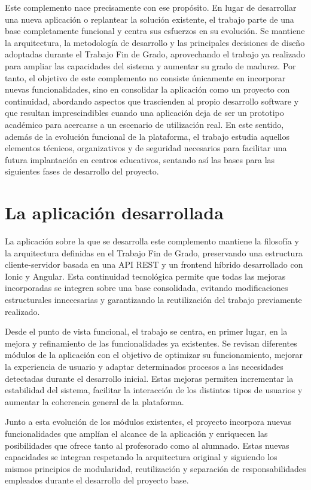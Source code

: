 Este complemento nace precisamente con ese propósito. En lugar de desarrollar una nueva aplicación o replantear la solución existente, el trabajo parte de una base completamente funcional y centra sus esfuerzos en su evolución. Se mantiene la arquitectura, la metodología de desarrollo y las principales decisiones de diseño adoptadas durante el Trabajo Fin de Grado, aprovechando el trabajo ya realizado para ampliar las capacidades del sistema y aumentar su grado de madurez.
Por tanto, el objetivo de este complemento no consiste únicamente en incorporar nuevas funcionalidades, sino en consolidar la aplicación como un proyecto con continuidad, abordando aspectos que trascienden al propio desarrollo software y que resultan imprescindibles cuando una aplicación deja de ser un prototipo académico para acercarse a un escenario de utilización real. En este sentido, además de la evolución funcional de la plataforma, el trabajo estudia aquellos elementos técnicos, organizativos y de seguridad necesarios para facilitar una futura implantación en centros educativos, sentando así las bases para las siguientes fases de desarrollo del proyecto.

\section{La aplicación desarrollada}

La aplicación sobre la que se desarrolla este complemento mantiene la filosofía y la arquitectura definidas en el Trabajo Fin de Grado, preservando una estructura cliente-servidor basada en una API REST y un frontend híbrido desarrollado con Ionic y Angular. Esta continuidad tecnológica permite que todas las mejoras incorporadas se integren sobre una base consolidada, evitando modificaciones estructurales innecesarias y garantizando la reutilización del trabajo previamente realizado.

Desde el punto de vista funcional, el trabajo se centra, en primer lugar, en la mejora y refinamiento de las funcionalidades ya existentes. Se revisan diferentes módulos de la aplicación con el objetivo de optimizar su funcionamiento, mejorar la experiencia de usuario y adaptar determinados procesos a las necesidades detectadas durante el desarrollo inicial. Estas mejoras permiten incrementar la estabilidad del sistema, facilitar la interacción de los distintos tipos de usuarios y aumentar la coherencia general de la plataforma.

Junto a esta evolución de los módulos existentes, el proyecto incorpora nuevas funcionalidades que amplían el alcance de la aplicación y enriquecen las posibilidades que ofrece tanto al profesorado como al alumnado. Estas nuevas capacidades se integran respetando la arquitectura original y siguiendo los mismos principios de modularidad, reutilización y separación de responsabilidades empleados durante el desarrollo del proyecto base.

